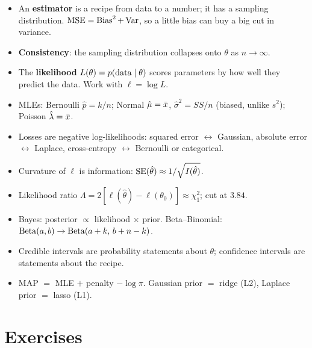 \begin{itemize}
  \item An \textbf{estimator} is a recipe from data to a number; it has a sampling
  distribution. $\operatorname{MSE} = \operatorname{Bias}^2 + \operatorname{Var}$, so a little bias can buy a big cut in variance.
  \item \textbf{Consistency}: the sampling distribution collapses onto $\theta$ as
  $n\to\infty$.
  \item The \textbf{likelihood} $L(\theta)=p(\text{data}\mid\theta)$ scores parameters
  by how well they predict the data. Work with $\ell = \log L$.
  \item MLEs: Bernoulli $\hat p = k/n$; Normal $\hat\mu = \bar{x}$,
  $\hat\sigma^2 = SS/n$ (biased, unlike $s^2$); Poisson $\hat\lambda = \bar{x}$.
  \item Losses are negative log-likelihoods: squared error $\leftrightarrow$ Gaussian,
  absolute error $\leftrightarrow$ Laplace, cross-entropy $\leftrightarrow$ Bernoulli or
  categorical.
  \item Curvature of $\ell$ is information: $\operatorname{SE}(\hat\theta)\approx 1/\sqrt{I(\hat\theta)}$.
  \item Likelihood ratio $\Lambda = 2[\ell(\hat\theta)-\ell(\theta_0)]\approx\chi^2_1$;
  cut at $3.84$.
  \item Bayes: posterior $\propto$ likelihood $\times$ prior. Beta--Binomial:
  $\operatorname{Beta}(a,b)\to\operatorname{Beta}(a+k,\,b+n-k)$.
  \item Credible intervals are probability statements about $\theta$; confidence intervals
  are statements about the recipe.
  \item MAP $=$ MLE $+$ penalty $-\log\pi$. Gaussian prior $=$ ridge (L2), Laplace prior
  $=$ lasso (L1).
\end{itemize}

\section{Exercises}

